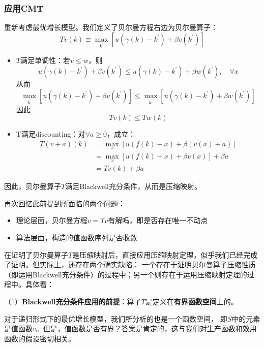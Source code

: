 \subsubsection{应用CMT}
重新考虑最优增长模型。我们定义了贝尔曼方程右边为贝尔曼算子：
$$
Tv\left(k\right) \equiv \max_{k^{\prime}} \left[u\left(\gamma\left(k\right)-k^{\prime}\right)+\beta v\left(k^{\prime}\right)\right]
$$
\begin{itemize}
    \item $T$满足单调性：若$v \leq w$，则
        $$u\left(\gamma\left(k\right)-k^{\prime}\right)+\beta v\left(k^{\prime}\right) \leq 
            u\left(\gamma\left(k\right)-k^{\prime}\right)+\beta w\left(k^{\prime}\right), \quad \forall x
        $$
        从而
        $$
        \max _{k^{\prime}}\left[u\left(\gamma\left(k\right)-k^{\prime}\right)+\beta v\left(k^{\prime}\right)\right] \leq 
        \max _{k^{\prime}}\left[u\left(\gamma\left(k\right)-k^{\prime}\right)+\beta w\left(k^{\prime}\right)\right]
        $$
        因此
        $$Tv\left(k\right)\leq Tw\left(k\right)$$
    \item T满足discounting：对$\forall a \geq 0$，成立：
        $$
        \begin{aligned}
            T(v+a)(k) & =\max _x[u(f(k)-x)+\beta(v(x)+a)] \\
            & =\max _x[u(f(k)-x)+\beta v(x)]+\beta a \\
            & =T v(k)+\beta a
        \end{aligned}
        $$
\end{itemize}
因此，贝尔曼算子$T$满足Blackwell充分条件，从而是压缩映射。

再次回忆此前提到所面临的两个问题：
\begin{itemize}
    \item 理论层面，贝尔曼方程$v=Tv$有解吗，即是否存在唯一不动点
    \item 算法层面，构造的值函数序列是否收敛
\end{itemize}

在证明了贝尔曼算子$T$是压缩映射后，直接应用压缩映射定理，似乎我们已经完成了证明。但实际上，还存在两个确实缺陷：
一个存在于证明贝尔曼算子压缩性质（即运用Blackwell充分条件）的过程中；另一个则存在于运用压缩映射定理的过程中。具体看：

（1）\textbf{Blackwell充分条件应用的前提}：算子$T$是定义在\textbf{有界函数空间}上的。

对于递归形式下的最优增长模型，我们所分析的也是一个函数空间，
即$S$中的元素是值函数$v$。但是，值函数是否有界？答案是肯定的，这与我们对生产函数和效用函数的假设密切相关。

